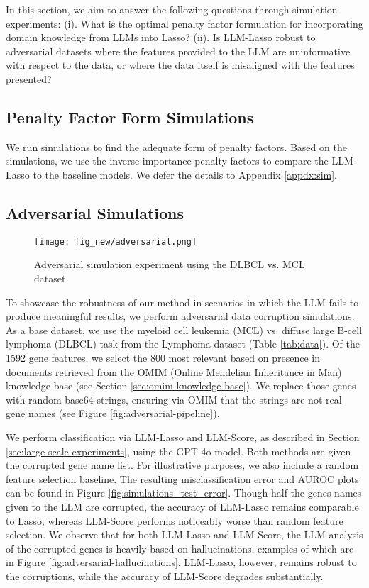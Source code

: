 In this section, we aim to answer the following questions through simulation experiments: 
(i). What is the optimal penalty factor formulation for incorporating domain knowledge from LLMs into Lasso? (ii). Is LLM-Lasso robust to adversarial datasets where the features provided to the LLM are uninformative with respect to the data, or where the data itself is misaligned with the features presented?
\subsection{Penalty Factor Form Simulations}\label{subsec:penalty_fac}
We run simulations to find the adequate form of penalty factors. Based on the simulations, we use the inverse importance penalty factors to compare the LLM-Lasso to the baseline models. We defer the details to Appendix \ref{appdx:sim}. 
\subsection{Adversarial Simulations}\label{subsec:adversarial}
\begin{figure}[H]
    \centering    \texttt{[image: fig\_new/adversarial.png]}
    \vspace{-3em}
    \scriptsize
    \caption{Adversarial simulation experiment using the DLBCL vs. MCL dataset}
    \label{fig:simulations_test_error2}
\end{figure}
To showcase the robustness of our method in scenarios in which the LLM fails to produce meaningful results, we perform adversarial data corruption simulations.
As a base dataset, we use the myeloid cell leukemia (MCL) vs. diffuse large B-cell lymphoma (DLBCL) task from the Lymphoma dataset (Table \ref{tab:data}).
Of the 1592 gene features, we select the 800 most relevant based on presence in documents retrieved from the \href{https://www.omim.org}{OMIM} (Online Mendelian Inheritance in Man) knowledge base (see Section \ref{sec:omim-knowledge-base}).
We replace those genes with random base64 strings, ensuring via OMIM that the strings are not real gene names (see Figure \ref{fig:adversarial-pipeline}).

We perform classification via LLM-Lasso and LLM-Score, as described in Section \ref{sec:large-scale-experiments}, using the GPT-4o model.
Both methods are given the corrupted gene name list.
For illustrative purposes, we also include a random feature selection baseline.
The resulting misclassification error and AUROC plots can be found in Figure \ref{fig:simulations_test_error}.
Though half the genes names given to the LLM are corrupted, the accuracy of LLM-Lasso remains comparable to Lasso, whereas LLM-Score performs noticeably worse than random feature selection.
We observe that for both LLM-Lasso and LLM-Score, the LLM analysis of the corrupted genes is heavily based on hallucinations, examples of which are in Figure \ref{fig:adversarial-hallucinations}.
LLM-Lasso, however, remains robust to the corruptions, while the accuracy of LLM-Score degrades substantially.

